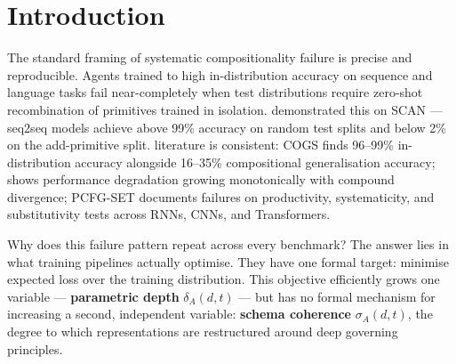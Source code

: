 %
%
\section{Introduction}\label{sec:introduction}

The standard framing of systematic compositionality failure is precise
and reproducible. Agents trained to high in-distribution accuracy on
sequence and language tasks fail near-completely when test distributions
require zero-shot recombination of primitives trained in isolation.
\cite{lake2018generalizationwithoutsystematicity} demonstrated this on
SCAN --- seq2seq models achieve above 99\% accuracy on random test splits
and below 2\% on the add-primitive split. %
literature is consistent: COGS \citep{kim2020cogscompositionalgeneralizationchallenge}
finds 96--99\% in-distribution accuracy alongside 16--35\% compositional
generalisation accuracy; %
shows performance degradation growing monotonically with compound
divergence; PCFG-SET \citep{hupkes2020compositionalitydecomposed} documents
failures on productivity, systematicity, and substitutivity tests across
RNNs, CNNs, and Transformers.

Why does this failure pattern repeat across every benchmark? The answer
lies in what training pipelines actually optimise. They have one formal
target: minimise expected loss over the training distribution. This
objective efficiently grows one variable --- \textbf{parametric depth}
$\delta_A(d,t)$ --- but has no formal mechanism for increasing a
second, independent variable: \textbf{schema coherence} $\sigma_A(d,t)$,
the degree to which representations are restructured around deep
governing principles.

